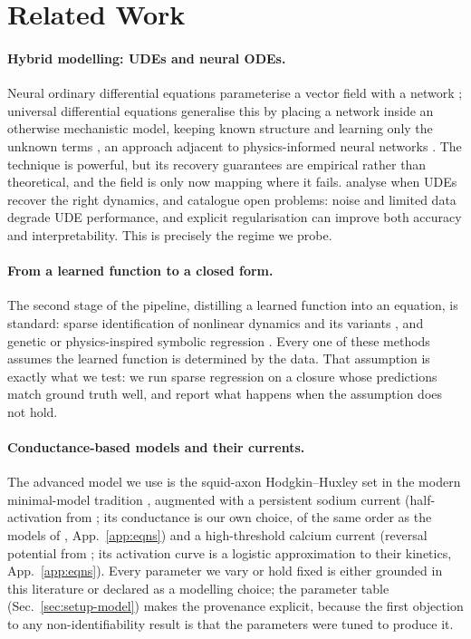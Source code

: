 \documentclass{article}
\begin{document}
\section{Related Work}
\label{sec:related}

\paragraph{Hybrid modelling: UDEs and neural ODEs.}
Neural ordinary differential equations parameterise a vector field with a network
\citep{chen2018neural}; universal differential equations generalise this by
placing a network inside an otherwise mechanistic model, keeping known structure
and learning only the unknown terms \citep{rackauckas2020universal}, an approach
adjacent to physics-informed neural networks \citep{raissi2019pinn}. The
technique is powerful, but its recovery guarantees are empirical rather than
theoretical, and the field is only now mapping where it fails.
\citet{silvestri2023analysis} analyse when UDEs recover the right dynamics, and
\citet{philipps2025ude} catalogue open problems: noise and limited data degrade
UDE performance, and explicit regularisation can improve both accuracy and
interpretability. This is
precisely the regime we probe.

\paragraph{From a learned function to a closed form.}
The second stage of the pipeline, distilling a learned function into an equation,
is standard: sparse identification of nonlinear dynamics
\citep{brunton2016sindy} and its variants \citep{rudy2017pdefind, zheng2019sr3,
fasel2022ensemblesindy, desilva2020pysindy}, and genetic or physics-inspired
symbolic regression \citep{cranmer2023pysr, udrescu2020aifeynman}. Every one of
these methods assumes the learned function is determined by the data. That
assumption is exactly what we test: we run sparse regression on a closure whose
predictions match ground truth well, and report what happens when the assumption
does not hold.

\paragraph{Conductance-based models and their currents.}
The advanced model we use is the squid-axon Hodgkin--Huxley set
\citep{hodgkin1952} in the modern minimal-model tradition \citep{pospischil2008},
augmented with a persistent sodium current (half-activation from
\citet{magistretti1999}; its conductance is our own choice, of the same order as
the models of \citet{golomb1997}, App.~\ref{app:eqns}) and a
high-threshold calcium current (reversal potential from
\citet{reuveni1993}; its activation curve is a logistic approximation to their kinetics, App.~\ref{app:eqns}). Every parameter we vary or hold fixed is either grounded in this
literature or declared as a modelling choice; the parameter table
(Sec.~\ref{sec:setup-model}) makes the provenance explicit, because the first
objection to any non-identifiability result is that the parameters were tuned to
produce it.
\end{document}
